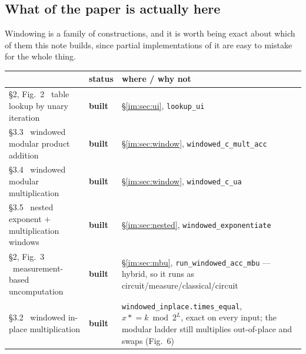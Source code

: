 \documentclass[11pt]{article}
\newcommand{\code}[1]{\texttt{#1}}
\theoremstyle{plain}
\theoremstyle{remark}
\begin{document}
\subsection{What of the paper is actually here}\label{im:sec:coverage}

Windowing is a family of constructions, and it is worth being exact about which of them this note
builds, since partial implementations of it are easy to mistake for the whole thing.

\begin{center}\small
\begin{tabular}{@{}llp{}@{}}
\toprule
\cite{gidney-window} & status & where / why not\\
\midrule
\S2, Fig.~2 \ table lookup by unary iteration & \textbf{built} & \S\ref{im:sec:ui}, \code{lookup\_ui}\\
\S3.3 \ windowed modular product addition     & \textbf{built} & \S\ref{im:sec:window}, \code{windowed\_c\_mult\_acc}\\
\S3.4 \ windowed modular multiplication       & \textbf{built} & \S\ref{im:sec:window}, \code{windowed\_c\_ua}\\
\S3.5 \ nested exponent $+$ multiplication windows & \textbf{built} & \S\ref{im:sec:nested}, \code{windowed\_exponentiate}\\
\midrule
\S2, Fig.~3 \ measurement-based uncomputation & \textbf{built} & \S\ref{im:sec:mbu}, \code{run\_windowed\_acc\_mbu} --- hybrid, so it runs as circuit/measure/classical/circuit\\[3pt]
\S3.2 \ windowed in-place multiplication      & \textbf{built} & \code{windowed\_inplace.times\_equal}, $x\mathrel{*}=k \bmod 2^L$, exact on every input; the modular ladder still multiplies out-of-place and swaps (Fig.~6)\\
\bottomrule
\end{tabular}
\end{center}
\end{document}
